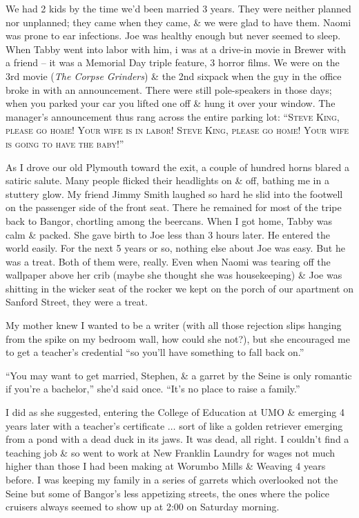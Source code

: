 \documentclass{article}
\numberwithin{equation}{section}
\begin{document}
 We had 2 kids by the time we'd been married 3 years. They were neither planned nor unplanned; they came when they came, \& we were glad to have them. Naomi was prone to ear infections. Joe was healthy enough but never seemed to sleep. When Tabby went into labor with him, i was at a drive-in movie in Brewer with a friend -- it was a Memorial Day triple feature, 3 horror films. We were on the 3rd movie (\textit{The Corpse Grinders}) \& the 2nd sixpack when the guy in the office broke in with an announcement. There were still pole-speakers in those days; when you parked your car you lifted one off \& hung it over your window. The manager's announcement thus rang across the entire parking lot: ``\textsc{Steve King, please go home! Your wife is in labor! Steve King, please go home! Your wife is going to have the baby!}''

As I drove our old Plymouth toward the exit, a couple of hundred horns blared a satiric salute. Many people flicked their headlights on \& off, bathing me in a stuttery glow. My friend Jimmy Smith laughed so hard he slid into the footwell on the passenger side of the front seat. There he remained for most of the tripe back to Bangor, chortling among the beercans. When I got home, Tabby was calm \& packed. She gave birth to Joe less than 3 hours later. He entered the world easily. For the next 5 years or so, nothing else about Joe was easy. But he was a treat. Both of them were, really. Even when Naomi was tearing off the wallpaper above her crib (maybe she thought she was housekeeping) \& Joe was shitting in the wicker seat of the rocker we kept on the porch of our apartment on Sanford Street, they were a treat.

 My mother knew I wanted to be a writer (with all those rejection slips hanging from the spike on my bedroom wall, how could she not?), but she encouraged me to get a teacher's credential ``so you'll have something to fall back on.''

``You may want to get married, Stephen, \& a garret by the Seine is only romantic if you're a bachelor,'' she'd said once. ``It's no place to raise a family.''

I did as she suggested, entering the College of Education at UMO \& emerging 4 years later with a teacher's certificate $\ldots$ sort of like a golden retriever emerging from a pond with a dead duck in its jaws. It was dead, all right. I couldn't find a teaching job \& so went to work at New Franklin Laundry for wages not much higher than those I had been making at Worumbo Mills \& Weaving 4 years before. I was keeping my family in a series of garrets which overlooked not the Seine but some of Bangor's less appetizing streets, the ones where the police cruisers always seemed to show up at 2:00 on Saturday morning.
\end{document}

